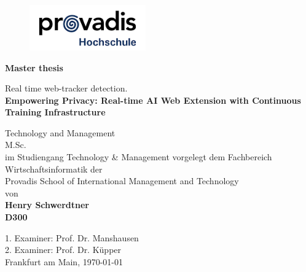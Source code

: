 \begin{titlepage}
	\strut
	\hfill
	\begin{center}
	\begin{figure}
	\begin{center}
	\includegraphics[width=5cm]{./images/provadis.png}
	\end{center}
	\end{figure}
			\large 
			\textbf{Master thesis}
		
		\vspace{0.5cm}
		\Huge
		\begin{spacing}{.9}
			Real time web-tracker detection.\\
			\vspace{0.5cm}
			\large
			\textbf{Empowering Privacy: Real-time AI Web Extension with Continuous Training Infrastructure} \\
		\end{spacing}
		\vspace{3cm}
		\small 
		
			Technology and Management \\
			\vspace{0.2cm}
			M.Sc. \\
			\vspace{0.2cm}
			im Studiengang Technology \& Management
		\vspace{1cm}
		\small
			vorgelegt dem Fachbereich Wirtschaftsinformatik der \\
			\vspace{0.1cm}
		Provadis School of International Management and Technology \\
		\vspace{0.1cm}
		von \\
		\vspace{1cm}
		\textbf{Henry Schwerdtner}\\
		\vspace{0.8cm}
		\textbf{D300}\\
		\vspace{1cm}
	 	\end{center}
		\begin{flushleft}
		1. Examiner: Prof. Dr. Manshausen \\
    2. Examiner: Prof. Dr. Küpper \\
		\vspace{2cm}
		Frankfurt am Main,  \today
		\end{flushleft}
\end{titlepage}

\shipout\null
